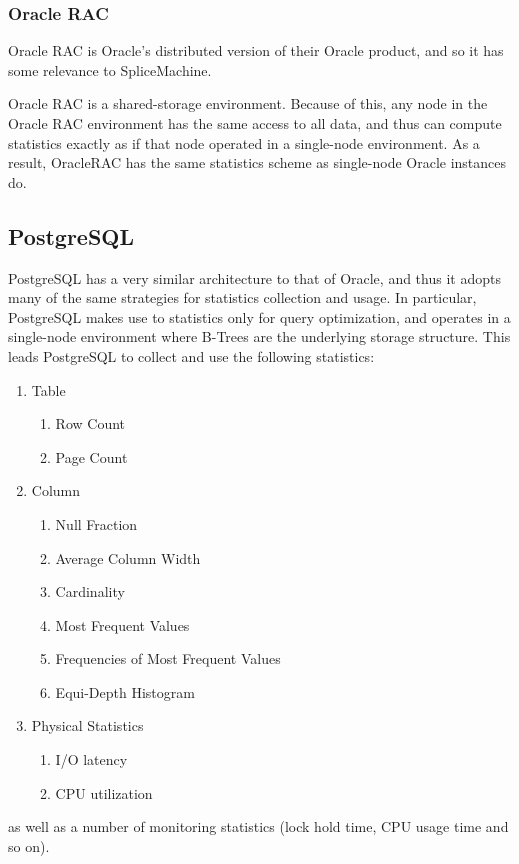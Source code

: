 \subsubsection{Oracle RAC}
Oracle RAC is Oracle's distributed version of their Oracle product, and so it has some relevance to SpliceMachine. 

Oracle RAC is a shared-storage environment\cite{OracleRAC}. Because of this, any node in the Oracle RAC environment has the same access to all data, and thus can compute statistics exactly as if that node operated in a single-node environment. As a result, OracleRAC has the same statistics scheme as single-node Oracle instances do.

\subsection{PostgreSQL}
PostgreSQL has a very similar architecture to that of Oracle, and thus it adopts many of the same strategies for statistics collection and usage. In particular, PostgreSQL makes use to statistics only for query optimization, and operates in a single-node environment where B-Trees are the underlying storage structure. This leads PostgreSQL to collect and use the following statistics\cite{PGCollector,PGStats,PGClass}:
\begin{enumerate}
				\item Table
								\begin{enumerate}
												\item Row Count
												\item Page Count
								\end{enumerate}
				\item Column
								\begin{enumerate}
												\item Null Fraction
												\item Average Column Width
												\item Cardinality
												\item Most Frequent Values
												\item Frequencies of Most Frequent Values
												\item Equi-Depth Histogram
								\end{enumerate}
				\item Physical Statistics
								\begin{enumerate}
												\item I/O latency
												\item CPU utilization
								\end{enumerate}
\end{enumerate}
as well as a number of monitoring statistics (lock hold time, CPU usage time and so on).


